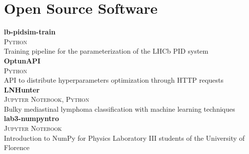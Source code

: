 \newcommand{\pkgname}[1]
  {\normalsize \color{hlcolor-0} \textbf{#1}}

\newcommand{\pkginfo}[1]
  {\small \color{hlcolor-1} \textsc{#1}}
  
\newcommand{\pkgdesc}[1]
  {\normalsize \color{maincolor} {#1}}


\section*{Open Source Software}
\begin{cvcontent}
  \pkgname{lb-pidsim-train} \hfill
  \\
  \pkginfo{Python}\\
  \pkgdesc{Training pipeline for the parameterization of the LHCb PID system}
  \\ [3mm]
  \pkgname{OptunAPI} \hfill
  \\
  \pkginfo{Python}\\
  \pkgdesc{API to distribute hyperparameters optimization through HTTP requests}
  \\ [3mm]
  \pkgname{LNHunter} \hfill
  \\
  \pkginfo{Jupyter Notebook, Python}\\
  \pkgdesc{Bulky mediastinal lymphoma classification with machine learning techniques}
  \\ [3mm]
  \pkgname{lab3-numpyntro} \hfill
  \\
  \pkginfo{Jupyter Notebook}\\
  \pkgdesc{Introduction to NumPy for Physics Laboratory III students of the University of Florence}
\end{cvcontent}